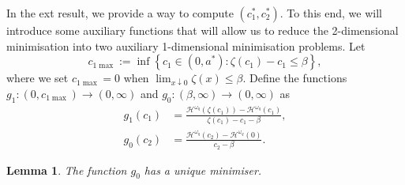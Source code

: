 \documentclass[10pt,a4paper]{amsart}
\newtheorem{lemma}{Lemma}[section]
\newcommand{\cH}{\mathcal{H}}
\newcommand{\homega}{\omega_q}
\newcommand{\BRA}[1]{{{\left\{#1\right\}}}} %
\renewcommand{\leq}{\leqslant}
\begin{document}
In the ext result, we provide a way to compute $(c_1^\ast,c_2^\ast)$. To this end, we will introduce some auxiliary functions that will allow us to reduce the 2-dimensional minimisation into two auxiliary 1-dimensional minimisation problems. Let
\[
c_{1\max}:= \inf\BRA{c_1\in (0,a^\ast): \zeta(c_1)-c_1 \leq \beta},
\]
where we set $c_{1\max} = 0$ when $\lim_{x\downarrow 0}\zeta(x)\leq \beta$. Define the functions $g_1 : (0,c_{1\max})\to (0,\infty)$ and $g_0:(\beta,\infty)\to (0,\infty)$ as
\begin{align}
	g_1(c_1) &= \frac{\cH^{\homega}(\zeta(c_1)) - \cH^{\homega}(c_1)}{\zeta(c_1)-c_1-\beta}, \label{eq.g1}\\
	g_0(c_2) &= \frac{\cH^{\homega}(c_2) - \cH^{\homega}(0)}{c_2-\beta}.\label{eq.c2}
\end{align}
\begin{lemma}\label{lemma.g0-min} The function $g_0$ has a unique minimiser.
\end{lemma}
\end{document}
